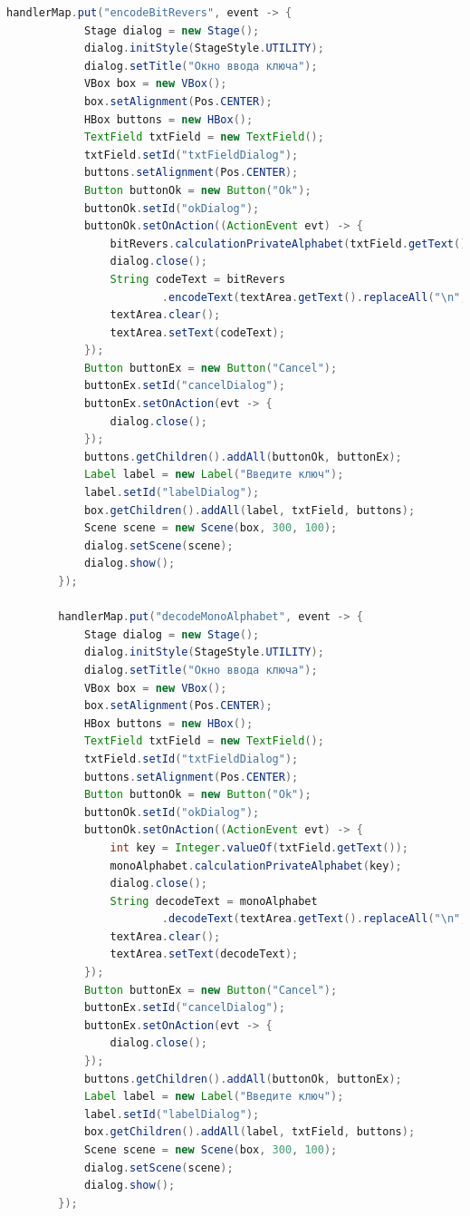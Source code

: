 \documentclass[a4paper,12pt]{article}
\begin{document}
\begin{lstlisting}[language=java, caption=код модуля MainWindowController.java]
        handlerMap.put("encodeBitRevers", event -> {
            Stage dialog = new Stage();
            dialog.initStyle(StageStyle.UTILITY);
            dialog.setTitle("Окно ввода ключа");
            VBox box = new VBox();
            box.setAlignment(Pos.CENTER);
            HBox buttons = new HBox();
            TextField txtField = new TextField();
            txtField.setId("txtFieldDialog");
            buttons.setAlignment(Pos.CENTER);
            Button buttonOk = new Button("Ok");
            buttonOk.setId("okDialog");
            buttonOk.setOnAction((ActionEvent evt) -> {
                bitRevers.calculationPrivateAlphabet(txtField.getText());
                dialog.close();
                String codeText = bitRevers
                        .encodeText(textArea.getText().replaceAll("\n", " "));
                textArea.clear();
                textArea.setText(codeText);
            });
            Button buttonEx = new Button("Cancel");
            buttonEx.setId("cancelDialog");
            buttonEx.setOnAction(evt -> {
                dialog.close();
            });
            buttons.getChildren().addAll(buttonOk, buttonEx);
            Label label = new Label("Введите ключ");
            label.setId("labelDialog");
            box.getChildren().addAll(label, txtField, buttons);
            Scene scene = new Scene(box, 300, 100);
            dialog.setScene(scene);
            dialog.show();
        });

        handlerMap.put("decodeMonoAlphabet", event -> {
            Stage dialog = new Stage();
            dialog.initStyle(StageStyle.UTILITY);
            dialog.setTitle("Окно ввода ключа");
            VBox box = new VBox();
            box.setAlignment(Pos.CENTER);
            HBox buttons = new HBox();
            TextField txtField = new TextField();
            txtField.setId("txtFieldDialog");
            buttons.setAlignment(Pos.CENTER);
            Button buttonOk = new Button("Ok");
            buttonOk.setId("okDialog");
            buttonOk.setOnAction((ActionEvent evt) -> {
                int key = Integer.valueOf(txtField.getText());
                monoAlphabet.calculationPrivateAlphabet(key);
                dialog.close();
                String decodeText = monoAlphabet
                        .decodeText(textArea.getText().replaceAll("\n", " "));
                textArea.clear();
                textArea.setText(decodeText);
            });
            Button buttonEx = new Button("Cancel");
            buttonEx.setId("cancelDialog");
            buttonEx.setOnAction(evt -> {
                dialog.close();
            });
            buttons.getChildren().addAll(buttonOk, buttonEx);
            Label label = new Label("Введите ключ");
            label.setId("labelDialog");
            box.getChildren().addAll(label, txtField, buttons);
            Scene scene = new Scene(box, 300, 100);
            dialog.setScene(scene);
            dialog.show();
        });


\end{lstlisting}
\end{document}
